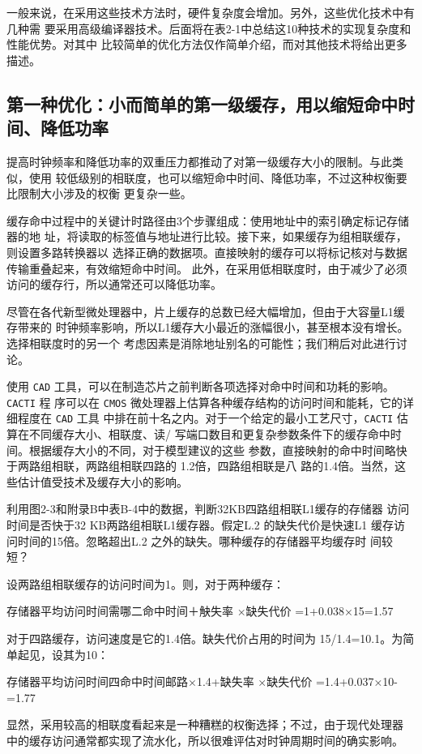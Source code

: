 一般来说，在采用这些技术方法时，硬件复杂度会增加。另外，这些优化技术中有几种需
要采用高级编译器技术。后面将在表2-1中总结这10种技术的实现复杂度和性能优势。对其中
比较简单的优化方法仅作简单介绍，而对其他技术将给出更多描述。

\subsection{第一种优化：小而简单的第一级缓存，用以缩短命中时间、降低功率}
提高时钟频率和降低功率的双重压力都推动了对第一级缓存大小的限制。与此类似，使用
较低级别的相联度，也可以缩短命中时间、降低功率，不过这种权衡要比限制大小涉及的权衡
更复杂一些。

缓存命中过程中的关键计时路径由3个步骤组成：使用地址中的索引确定标记存储器的地
址，将读取的标签值与地址进行比较。接下来，如果缓存为组相联缓存，则设置多路转换器以
选择正确的数据项。直接映射的缓存可以将标记核对与数据传输重叠起来，有效缩短命中时间。
此外，在采用低相联度时，由于减少了必须访问的缓存行，所以通常还可以降低功率。

尽管在各代新型微处理器中，片上缓存的总数已经大幅增加，但由于大容量L1缓存带来的
时钟频率影响，所以L1缓存大小最近的涨幅很小，甚至根本没有增长。选择相联度时的另一个
考虑因素是消除地址别名的可能性；我们稍后对此进行讨论。

使用 \verb|CAD| 工具，可以在制造芯片之前判断各项选择对命中时间和功耗的影响。\verb|CACTI| 程
序可以在 \verb|CMOS| 微处理器上估算各种缓存结构的访问时间和能耗，它的详细程度在 \verb|CAD| 工具
中排在前十名之内。对于一个给定的最小工艺尺寸，\verb|CACTI| 估算在不同缓存大小、相联度、读/
写端口数目和更复杂参数条件下的缓存命中时间。根据缓存大小的不同，对于模型建议的这些
参数，直接映射的命中时间略快于两路组相联，两路组相联四路的 1.2倍，四路组相联是八
路的1.4倍。当然，这些估计值受技术及缓存大小的影响。

\begin{exercise}
    利用图2-3和附录B中表B-4中的数据，判断32KB四路组相联L1缓存的存储器
    访问时间是否快于32 KB两路组相联L1缓存器。假定L.2 的缺失代价是快速L1
    缓存访问时间的15倍。忽略超出L.2 之外的缺失。哪种缓存的存储器平均缓存时
    间较短？
\end{exercise}

\begin{solution}
    设两路组相联缓存的访问时间为1。则，对于两种缓存：

    存储器平均访问时间需哪二命中时间＋觖失率 ×缺失代价
    =1+0.038×15=1.57

    对于四路缓存，访问速度是它的1.4倍。缺失代价占用的时间为 15/1.4=10.1。为简
    单起见，设其为10：

    存储器平均访问时间四命中时间邮路×1.4+缺失率 ×缺失代价
    =1.4+0.037×10-=1.77

    显然，采用较高的相联度看起来是一种糟糕的权衡选择；不过，由于现代处理器
    中的缓存访问通常都实现了流水化，所以很难评估对时钟周期时间的确实影响。
\end{solution}

